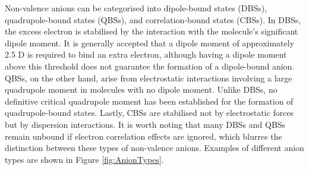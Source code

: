 Non-valence anions can be categorised into dipole-bound states (DBSs)\cite{fermi1947capture,wallis1960energy,desfranccois1996abdoul,gutowski1996contribution,jordan2003theory,qian2019probing,gulania2020quest,yuan2020observation,slimak2022binding,yuan2023observation}, quadrupole-bound states (QBSs)\cite{jordan1979binding,desfranccois2004long,sommerfeld2014excess,zhu2017observation,liu2019ground,liu2020observation}, and correlation-bound states (CBSs)\cite{sommerfeld2010correlation,bezchastnov2011anions,voora2013existence,voora2014nonvalence,voora2015nonvalence,voora2017theoretical,ciborowski2019correlation,krafft2022perfluorocubane}.
In DBSs, the excess electron is stabilised by the interaction with the molecule's significant dipole moment. It is generally accepted that a dipole moment of approximately 2.5 D is required to bind an extra electron\cite{jordan2003theory}, although having a dipole moment above this threshold does not guarantee the formation of a dipole-bound anion. QBSs, on the other hand, arise from electrostatic interactions involving a large quadrupole moment in molecules with no dipole moment. Unlike DBSs, no definitive critical quadrupole moment has been established for the formation of quadrupole-bound states\cite{sommerfeld2014excess}. Lastly, CBSs are stabilised not by electrostatic forces but by dispersion interactions. It is worth noting that many DBSs and QBSs remain unbound if electron correlation effects are ignored, which blurres the distinction between these types of non-valence anions\cite{voora2017theoretical}. Examples of different anion types are shown in Figure \ref{fig:AnionTypes}.

